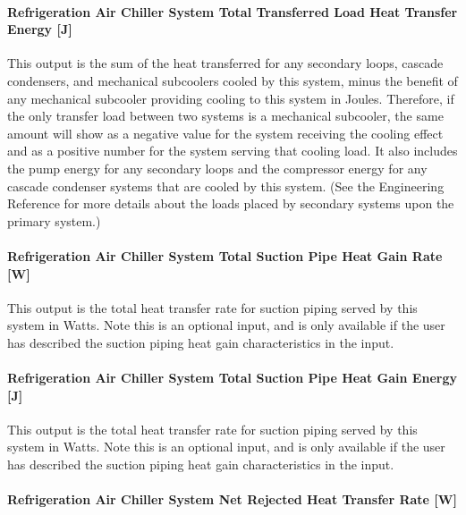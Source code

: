 \paragraph{Refrigeration Air Chiller System Total Transferred Load Heat Transfer Energy {[}J{]}}\label{refrigeration-air-chiller-system-total-transferred-load-heat-transfer-energy-j}

This output is the sum of the heat transferred for any secondary loops, cascade condensers, and mechanical subcoolers cooled by this system, minus the benefit of any mechanical subcooler providing cooling to this system in Joules. Therefore, if the only transfer load between two systems is a mechanical subcooler, the same amount will show as a negative value for the system receiving the cooling effect and as a positive number for the system serving that cooling load. It also includes the pump energy for any secondary loops and the compressor energy for any cascade condenser systems that are cooled by this system. (See the Engineering Reference for more details about the loads placed by secondary systems upon the primary system.)

\paragraph{Refrigeration Air Chiller System Total Suction Pipe Heat Gain Rate {[}W{]}}\label{refrigeration-air-chiller-system-total-suction-pipe-heat-gain-rate-w}

This output is the total heat transfer rate for suction piping served by this system in Watts. Note this is an optional input, and is only available if the user has described the suction piping heat gain characteristics in the input.

\paragraph{Refrigeration Air Chiller System Total Suction Pipe Heat Gain Energy {[}J{]}}\label{refrigeration-air-chiller-system-total-suction-pipe-heat-gain-energy-j}

This output is the total heat transfer rate for suction piping served by this system in Watts. Note this is an optional input, and is only available if the user has described the suction piping heat gain characteristics in the input.

\paragraph{Refrigeration Air Chiller System Net Rejected Heat Transfer Rate {[}W{]}}\label{refrigeration-air-chiller-system-net-rejected-heat-transfer-rate-w}


